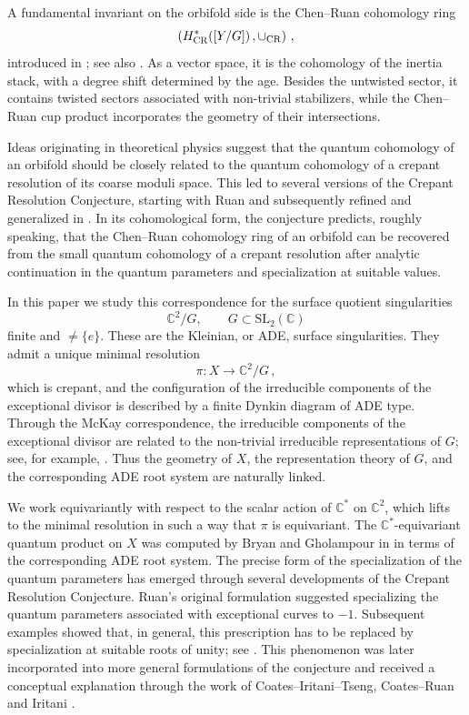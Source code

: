 \documentclass[a4paper,reqno]{amsart}
\theoremstyle{plain} %
\theoremstyle{definition} %
\theoremstyle{remark} %
\newcommand{\1}{\mathds{1}}   %
\begin{document}
A fundamental invariant on the orbifold side is the Chen--Ruan
cohomology ring
\[
\left( H^*_{\mathrm{CR}}([Y/G]) \, , \cup_{{\rm CR}} \right) \, ,
\]
introduced in \cite{CR04}; see also \cite{FG03,ALR07}. As a vector
space, it is the cohomology of the inertia stack, with a degree shift
determined by the age. Besides the untwisted sector, it contains
twisted sectors associated with non-trivial stabilizers, while the
Chen--Ruan cup product incorporates the geometry of their
intersections.

Ideas originating in theoretical physics suggest that the quantum
cohomology of an orbifold should be closely related to the quantum
cohomology of a crepant resolution of its coarse moduli space. This
led to several versions of the Crepant Resolution Conjecture, starting
with Ruan \cite{RuanCCRC} and subsequently refined and generalized in
\cite{BG09,CIT09,CR13}. In its cohomological form, the conjecture
predicts, roughly speaking, that the Chen--Ruan cohomology ring of an
orbifold can be recovered from the small quantum cohomology of a
crepant resolution after analytic continuation in the quantum
parameters and specialization at suitable values.

In this paper we study this correspondence for the surface quotient
singularities
\[
\mathbb C^2/G,
\qquad
G\subset \mathrm{SL}_2(\mathbb C)
\]
finite and $\not= \{ e \}$. These are the Kleinian, or ADE, surface singularities. They
admit a unique minimal resolution
\[
\pi:X\longrightarrow\mathbb C^2/G \, ,
\]
which is crepant, and the configuration of the irreducible components of the exceptional divisor is
described by a finite Dynkin diagram of ADE type.
Through the McKay correspondence, the irreducible components of the
exceptional divisor are related to the non-trivial irreducible
representations of $G$; see, for example,
\cite{McKay,GSVMcKay, CS98,ReidMcKay, DolgachevMcKay}. Thus the geometry of $X$, the representation
theory of $G$, and the corresponding ADE root system are naturally
linked.

We work equivariantly with respect to the scalar action of
$\mathbb C^*$ on $\mathbb C^2$, which lifts to the minimal resolution in such a way that $\pi$ is equivariant.
The $\mathbb C^*$-equivariant quantum product on $X$ was computed by
Bryan and Gholampour in \cite{bryan2008root} in terms of the corresponding ADE
root system. 
The precise form of the specialization of the quantum parameters has
emerged through several developments of the Crepant Resolution
Conjecture. Ruan's original formulation suggested specializing the
quantum parameters associated with exceptional curves to $-1$.
Subsequent examples showed that, in general, this prescription has to
be replaced by specialization at suitable roots of unity; see
\cite{Perroni07,BGP08}. This phenomenon was later incorporated into more
general formulations of the conjecture and received a conceptual
explanation through the work of Coates--Iritani--Tseng, Coates--Ruan and Iritani
\cite{CIT09, CR13,Iritani10}.
\end{document}
